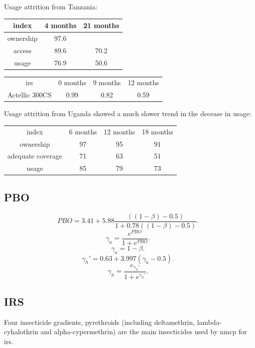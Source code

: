 \documentclass[a4paper, 12pt, twoside]{article}
\begin{document}
Usage attrition from Tanzania\cite{Protopopoff2018}:

\begin{center}
	\begin{tabular}{c c c}
		\toprule
		index     & 4 months & 21 months \\
		\midrule
		ownership & 97.6     &           \\
		access    & 89.6     & 70.2      \\
		usage     & 76.9     & 50.6      \\
		\bottomrule
	\end{tabular}
\end{center}

\begin{center}
	\begin{tabular}{c c c c}
		\gls{irs}      & 0 months & 9 months & 12 months \\
		Actellic 300CS & 0.99     & 0.82     & 0.59      \\
	\end{tabular}
\end{center}

Usage attrition from Uganda\cite{Staedke2020} showed a much slower trend in the decease in usage:

\begin{center}
	\begin{tabular}{c c c c}
		index             & 6 months & 12 months & 18 months \\
		ownership         & 97       & 95        & 91        \\
		adequate coverage & 71       & 63        & 51        \\
		usage             & 85       & 79        & 73
	\end{tabular}
\end{center}

\subsection{PBO}

\[
	PBO = 3.41 + 5.88 \frac{((1-\beta) - 0.5)}{1 + 0.78 ((1-\beta) - 0.5)}
	.\]
\[
	\gamma_a = \frac{e^{PBO}}{1 + e^{PBO}}
	.\]
\[
	\gamma_a = 1 - \beta
	.\]
\[
	\gamma_h' = 0.63 + 3.997 ( \gamma_a - 0.5 )
	.\]
\[
	\gamma_h = \frac{e_{\gamma_h'}}{1+e^{\gamma_h'}}
	.\]

\subsection{IRS}
Four insecticide gradients, pyrethroids (including deltamethrin, lambda-cyhalothrin and alpha-cypermethrin) are the main insecticides used by \gls{nmcp} for \gls{irs}.
\end{document}
